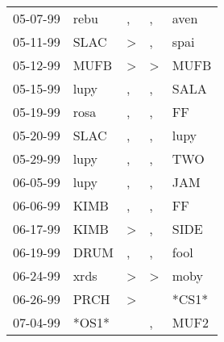 \begin{supertabular}{p{0.07\textwidth}p{0.06\textwidth}p{0.02\textwidth}p{0.02\textwidth}p{0.06\textwidth}}
          05-07-99\textsuperscript{} &           rebu\textsuperscript{} &                , &                , &           aven\textsuperscript{} \\
          05-11-99\textsuperscript{} &           SLAC\textsuperscript{} &     \textgreater &                , &           spai\textsuperscript{} \\
          05-12-99\textsuperscript{} &           MUFB\textsuperscript{} &     \textgreater &     \textgreater &           MUFB\textsuperscript{} \\
          05-15-99\textsuperscript{} &           lupy\textsuperscript{} &                , &                , &           SALA\textsuperscript{} \\
          05-19-99\textsuperscript{} &           rosa\textsuperscript{} &                , &                , &             FF\textsuperscript{} \\
          05-20-99\textsuperscript{} &           SLAC\textsuperscript{} &                , &                , &           lupy\textsuperscript{} \\
          05-29-99\textsuperscript{} &           lupy\textsuperscript{} &                , &                , &            TWO\textsuperscript{} \\
          06-05-99\textsuperscript{} &           lupy\textsuperscript{} &                , &                , &            JAM\textsuperscript{} \\
          06-06-99\textsuperscript{} &           KIMB\textsuperscript{} &                , &                , &             FF\textsuperscript{} \\
          06-17-99\textsuperscript{} &           KIMB\textsuperscript{} &     \textgreater &                , &           SIDE\textsuperscript{} \\
          06-19-99\textsuperscript{} &           DRUM\textsuperscript{} &                , &                , &           fool\textsuperscript{} \\
          06-24-99\textsuperscript{} &           xrds\textsuperscript{} &     \textgreater &     \textgreater &           moby\textsuperscript{} \\
          06-26-99\textsuperscript{} &           PRCH\textsuperscript{} &     \textgreater &                  &                            *CS1* \\
          07-04-99\textsuperscript{} &                            *OS1* &                  &                , &           MUF2\textsuperscript{} \\

\end{supertabular}
